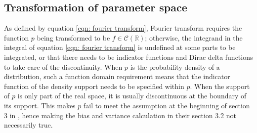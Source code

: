 \documentclass[%
 reprint,
 amsmath,amssymb,
 aps,
]{revtex4-2}
\def\R{\mathbb{R}}
\begin{document}

\subsection{\label{subsec:transformation of parameter space} Transformation of parameter space}
As defined by equation \eqref{eqn: fourier transform}, Fourier transform requires the function $p$ being transformed to be $f \in \mathcal{C}(\R)$; otherwise, the integrand in the integral of equation \eqref{eqn: fourier transform} is undefined at some parts to be integrated, or that there needs to be indicator functions and Dirac delta functions to take care of the discontinuity. When $p$ is the probability density of a distribution, such a function domain requirement means that the indicator function of the density support needs to be specified within $p$. When the support of $p$ is only part of the real space, it is usually discontinuous at the boundary of its support. This makes $p$ fail to meet the assumption at the beginning of section 3 in \cite{rotiroti2022computing}, hence making the bias and variance calculation in their section 3.2 not necessarily true.
\end{document}
